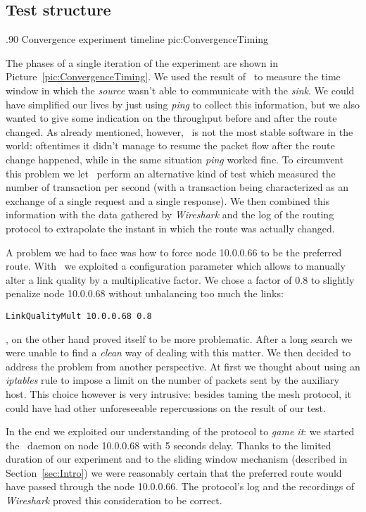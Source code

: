 \subsection{Test structure}

        {.90\columnwidth}
        {Convergence experiment timeline}
        {pic:ConvergenceTiming}


The phases of a single iteration of the experiment are shown in
Picture~\ref{pic:ConvergenceTiming}.
We used the result of \netperf\ to measure the time window in
which the \emph{source} wasn't able to communicate with the
\emph{sink}. We could have simplified our lives by just using \emph{ping}
to collect this information, but we also wanted to give some indication
on the throughput before and after the route changed. As already
mentioned, however, \netperf\ is not the most stable software in the
world: oftentimes it didn't manage to resume the packet flow after
the route change happened, while in the same situation \emph{ping} worked
fine. To circumvent this problem we let \netperf\ perform
an alternative kind of test which measured the number of transaction
per second (with a transaction being characterized as an exchange of a
single request and a single response).
We then combined this information with the data gathered
by \emph{Wireshark} and the log of the routing protocol to extrapolate
the instant in which the route was actually changed.

A problem we had to face was how to force node 10.0.0.66 to be the
preferred route. With \olsr\ we exploited a configuration parameter
which allows to manually alter a link quality by a multiplicative
factor. We chose a factor of $0.8$ to slightly penalize node 10.0.0.68
without unbalancing too much the links:

\begin{verbatim}
LinkQualityMult 10.0.0.68 0.8
\end{verbatim}

\batman, on the other hand proved itself to be more problematic. After a
long search
we were unable to find a \emph{clean} way of dealing with this
matter. We then decided to address the problem from another perspective.
At first we thought about using an \emph{iptables} rule to impose a
limit on the number of packets sent by the auxiliary host. This choice
however is very intrusive: besides taming the mesh protocol, it
could have had other unforeseeable repercussions on the result of our
test.

In the end we exploited our understanding of the protocol to \emph{game
it}: we started the \batman\ daemon on node 10.0.0.68 with 5 seconds
delay. Thanks to the limited duration of our experiment and to the sliding
window mechanism (described in Section~\ref{sec:Intro}) we were reasonably
certain that the preferred route would have passed through the node
10.0.0.66. The protocol's log and the recordings of \emph{Wireshark}
proved this consideration to be correct.

